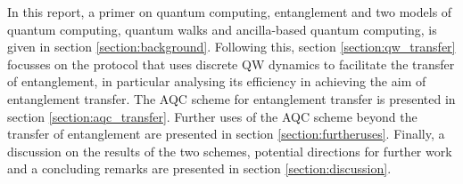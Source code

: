 In this report, a primer on quantum computing, entanglement and two models of quantum computing, quantum walks and ancilla-based quantum computing, is given in section {\ref{section:background}}.
Following this, section {\ref{section:qw_transfer}} focusses on the protocol that uses discrete QW dynamics to facilitate the transfer of entanglement, in particular analysing its efficiency in achieving the aim of entanglement transfer. 
The AQC scheme for entanglement transfer is presented in section \ref{section:aqc_transfer}. 
Further uses of the AQC scheme beyond the transfer of entanglement are presented in section \ref{section:furtheruses}. 
Finally, a discussion on the results of the two schemes, potential directions for further work and a concluding remarks are presented in section \ref{section:discussion}.
